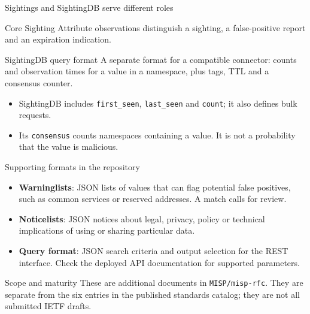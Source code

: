 \begin{frame}{Sightings and SightingDB serve different roles}
\begin{block}{Core Sighting}
Attribute observations distinguish a sighting, a false-positive report and an expiration indication.
\end{block}
\begin{block}{SightingDB query format}
A separate format for a compatible connector: counts and observation times for a value in a namespace, plus tags, TTL and a consensus counter.
\end{block}
\begin{itemize}
  \item SightingDB includes \texttt{first\_seen}, \texttt{last\_seen} and \texttt{count}; it also defines bulk requests.
  \item Its \texttt{consensus} counts namespaces containing a value. It is not a probability that the value is malicious.
\end{itemize}
\end{frame}

\begin{frame}{Supporting formats in the repository}
\small
\begin{itemize}
  \item \textbf{Warninglists}: JSON lists of values that can flag potential false positives, such as common services or reserved addresses. A match calls for review.
  \item \textbf{Noticelists}: JSON notices about legal, privacy, policy or technical implications of using or sharing particular data.
  \item \textbf{Query format}: JSON search criteria and output selection for the REST interface. Check the deployed API documentation for supported parameters.
\end{itemize}
\begin{block}{Scope and maturity}
These are additional documents in \texttt{MISP/misp-rfc}. They are separate from the six entries in the published standards catalog; they are not all submitted IETF drafts.
\end{block}
\end{frame}

